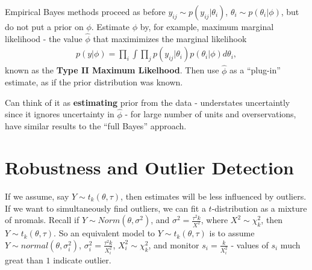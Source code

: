 \begin{defn}
  \label{sec:heirachcial-models-4}
  Empirical Bayes methods proceed as before $y_{ij} \sim p(y_{ij} |
  \theta_{i})$, $\theta_{i} \sim p(\theta_{i} | \phi)$, but do not put
  a prior on $\phi$.  Estimate $\phi$ by, for example, maximum
  marginal likelihood - the value $\hat \phi$ that maximimizes the
  marginal likelihook
  \begin{align}
    \label{eq:22}
    p(y | \phi) = \prod_{i} \int \prod_{j} p(y_{ij} | \theta_{i})
    p(\theta_{i} | \phi) d \theta_{i},
  \end{align}  known as the \textbf{Type II Maximum Likelhood}.  Then
  use $\hat \phi$ as a ``plug-in'' estimate, as if the prior
  distribution was known.

  Can think of it as \textbf{estimating} prior from the data -
  understates uncertaintly since it ignores uncertainty in $\hat \phi$
  - for large number of units and overservations, have similar results
  to the ``full Bayes'' approach.
\end{defn}


\section{Robustness and Outlier Detection}
\label{sec:robustn-outl-detect}

\begin{defn}
  \label{sec:robustn-outl-detect-1}
  If we assume, say $Y \sim t_{k}(\theta, \tau)$, then estimates will
  be less influenced by outliers.  If we want to simultaneously find
  outliers, we can fit a $t$-distribution as a mixture of nromals.
  Recall if $Y \sim Norm(\theta, \sigma^{2})$, and $\sigma^{2} =
  \frac{\tau^{2} k}{X^{2}} $, where $X^{2} \sim \chi^{2}_{k}$, then $Y
  \sim t_{k}(\theta, \tau)$.    So an equivalent model to $Y \sim
  t_{k}(\theta, \tau)$ is to assume $Y \sim normal(\theta,
  \sigma_{i}^{2})$, $\sigma_{i}^{2} = \frac{\tau^{2} k }{X_{i}^{2}} $,
  $X_{i}^{2} \sim \chi^{2}_{k}$, and monitor $s_{i} =
  \frac{k}{X_{i}^{2}} $ - values of $s_{i}$ much great than $1$
  indicate outlier.
\end{defn}






